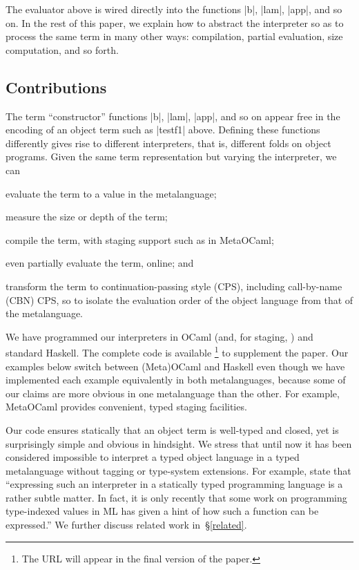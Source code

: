 \documentclass[preprint]{sigplanconf}
\begin{document}
The evaluator above is wired directly into the
functions |b|, |lam|, |app|, and so on.  In the rest of this paper, 
we explain how to abstract the interpreter so as
to process the same term in many other
ways: compilation, partial evaluation, size
computation, and so forth.

\subsection{Contributions}\label{contributions}

The term ``constructor'' functions |b|, |lam|, |app|, and so on appear
free in the encoding of an object term such as |testf1| above.  Defining
these functions differently gives rise to different interpreters, that
is, different folds on object programs.  Given the same term
representation but varying the interpreter, we can
\begin{itemize*}
    \item evaluate the term to a value in the metalanguage;
    \item measure the size or depth of the term;
    \item compile the term, with staging support such as in MetaOCaml;
    \item even partially evaluate the term, online; and
    \item transform the term to continuation\hyp passing style (CPS),
        including call-by-name (CBN) CPS, so to isolate the evaluation
        order of the object language from that of the metalanguage.
\end{itemize*}
We have programmed our interpreters in OCaml (and, for staging,
\citet{metaocaml}) and standard Haskell. The complete code is available%
\footnote{The URL will appear in the final version of the paper.}
to supplement the paper. Our examples below switch between (Meta)OCaml
and Haskell even though we have implemented each example equivalently in
both metalanguages, because some of our claims are more obvious in one
metalanguage than the other.  For example, MetaOCaml provides
convenient, typed staging facilities.

Our code ensures statically that an object term is well-typed and
closed, yet is surprisingly simple and obvious in hindsight.  We stress
that until now it has been considered impossible to
interpret a typed object language in a typed metalanguage without
tagging or type\hyp system extensions.  For example, \citet{taha-tag}
state that ``expressing such an interpreter in a statically typed
programming language is a rather subtle matter. In fact, it is only
recently that some work on programming type-indexed values in ML
\citep{yang-encoding} has given a hint of how such a function can be
expressed.''  We further discuss related work in~\S\ref{related}.
\end{document}
